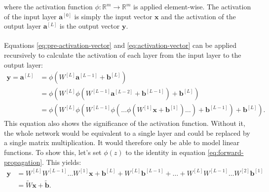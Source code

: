 where the activation function $\phi: \mathbb{R}^m \rightarrow \mathbb{R}^m$ is applied element-wise.
The activation of the input layer $\bm{a}^{[0]}$ is simply the input vector $\bm{x}$ and the activation of the output layer $\bm{a}^{[L]}$ is the output vector $\bm{y}$.
\\
\\
Equations \ref{eq:pre-activation-vector} and \ref{eq:activation-vector} can be applied recursively to calculate the activation of each layer from the input layer to the output layer:
\begin{align}
    \bm{y} = \bm{a}^{[L]} &= \phi(W^{[L]} \bm{a}^{[L-1]} + \bm{b}^{[L]}) \\
    &= \phi(W^{[L]} \phi(W^{[L-1]} \bm{a}^{[L-2]} + \bm{b}^{[L-1]}) + \bm{b}^{[L]}) \\
    &= \phi(W^{[L]} \phi(W^{[L-1]} \phi(\dots \phi(W^{[1]} \bm{x} + \bm{b}^{[1]}) \dots) + \bm{b}^{[L-1]}) + \bm{b}^{[L]}) \text{.}
    \label{eq:forward-propagation}
\end{align}
This equation also shows the significance of the activation function.
Without it, the whole network would be equivalent to a single layer and could be replaced by a single matrix multiplication.
It would therefore only be able to model linear functions.
To show this, let's set $\phi(z)$ to the identity in equation \ref{eq:forward-propagation}.
This yields:
\begin{align}
    \bm{y} &= W^{[L]} W^{[L-1]} \dots W^{[1]} \bm{x} + \bm{b}^{[L]} + W^{[L]} \bm{b}^{[L-1]} + \dots + W^{[L]} W^{[L-1]} \dots W^{[2]} \bm{b}^{[1]} \\
    &= \widetilde{W} \bm{x} + \tilde{\bm{b}} \text{.}
    \label{eq:linear-network}
\end{align}

